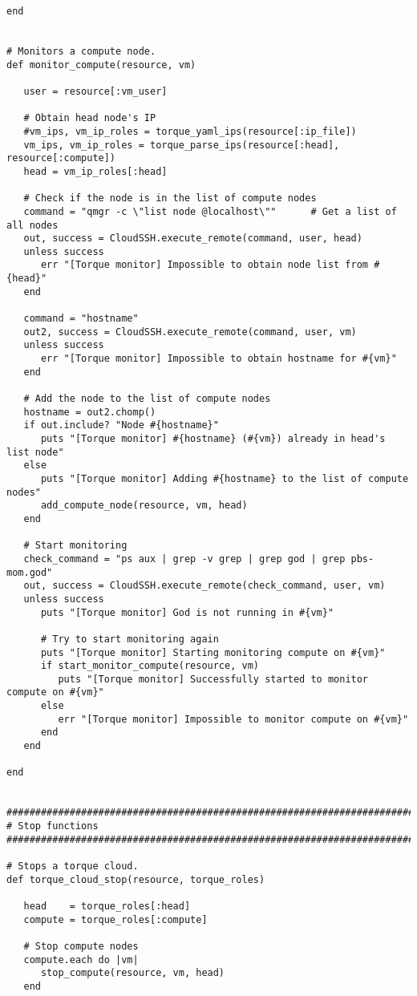 \begin{lstlisting}
end


# Monitors a compute node.
def monitor_compute(resource, vm)

   user = resource[:vm_user]

   # Obtain head node's IP
   #vm_ips, vm_ip_roles = torque_yaml_ips(resource[:ip_file])
   vm_ips, vm_ip_roles = torque_parse_ips(resource[:head], resource[:compute])
   head = vm_ip_roles[:head]

   # Check if the node is in the list of compute nodes
   command = "qmgr -c \"list node @localhost\""      # Get a list of all nodes
   out, success = CloudSSH.execute_remote(command, user, head)
   unless success
      err "[Torque monitor] Impossible to obtain node list from #{head}"
   end

   command = "hostname"
   out2, success = CloudSSH.execute_remote(command, user, vm)
   unless success
      err "[Torque monitor] Impossible to obtain hostname for #{vm}"
   end

   # Add the node to the list of compute nodes
   hostname = out2.chomp()
   if out.include? "Node #{hostname}"
      puts "[Torque monitor] #{hostname} (#{vm}) already in head's list node"
   else
      puts "[Torque monitor] Adding #{hostname} to the list of compute nodes"
      add_compute_node(resource, vm, head)
   end

   # Start monitoring
   check_command = "ps aux | grep -v grep | grep god | grep pbs-mom.god"
   out, success = CloudSSH.execute_remote(check_command, user, vm)
   unless success
      puts "[Torque monitor] God is not running in #{vm}"
      
      # Try to start monitoring again
      puts "[Torque monitor] Starting monitoring compute on #{vm}"
      if start_monitor_compute(resource, vm)
         puts "[Torque monitor] Successfully started to monitor compute on #{vm}"
      else
         err "[Torque monitor] Impossible to monitor compute on #{vm}"
      end
   end
   
end


################################################################################
# Stop functions
################################################################################

# Stops a torque cloud.
def torque_cloud_stop(resource, torque_roles)

   head    = torque_roles[:head]
   compute = torque_roles[:compute]
   
   # Stop compute nodes
   compute.each do |vm|
      stop_compute(resource, vm, head)
   end
   

\end{lstlisting}
